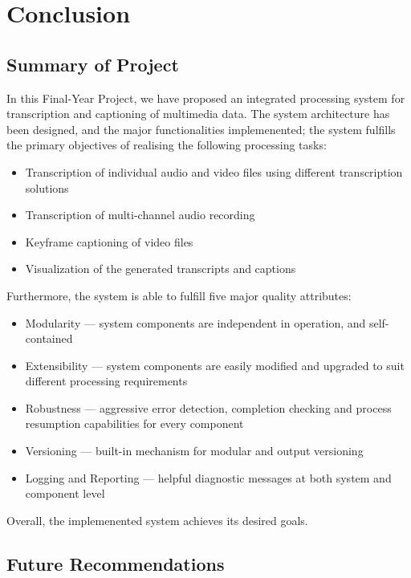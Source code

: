 \chapter{Conclusion}

\section{Summary of Project}

In this Final-Year Project, we have proposed an integrated
processing system for transcription and captioning of multimedia
data. The system architecture has been designed, and the major
functionalities implemenented; the system fulfills the primary
objectives of realising the following processing tasks:

\begin{itemize}
    \item Transcription of individual audio and video files using different
    transcription solutions
    \item Transcription of multi-channel audio recording
    \item Keyframe captioning of video files
    \item Visualization of the generated transcripts and captions
\end{itemize}

Furthermore, the system is able to fulfill five major quality attributes:

\begin{itemize}
    \item Modularity --- system components are independent in operation, and
    self-contained
    \item Extensibility --- system components are easily modified and upgraded
    to suit different processing requirements
    \item Robustness --- aggressive error detection, completion checking and
    process resumption capabilities for every component
    \item Versioning --- built-in mechanism for modular and output versioning
    \item Logging and Reporting --- helpful diagnostic messages at both system
    and component level
\end{itemize}

Overall, the implemenented system achieves its desired goals.

\section{Future Recommendations}

